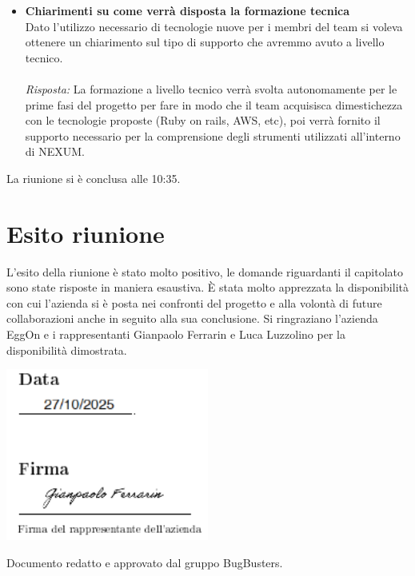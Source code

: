 \documentclass[a4paper,12pt]{article}
\begin{document}
\begin{itemize}
    \item \textbf{Chiarimenti su come verrà disposta la formazione tecnica}\\
    \noindent
    Dato l'utilizzo necessario di tecnologie nuove per i membri del team si voleva ottenere un chiarimento sul tipo di supporto che avremmo avuto a livello tecnico. \\ \\
    \textit{Risposta:} 
    La formazione a livello tecnico verrà svolta autonomamente per le prime fasi del progetto per fare in modo che il team acquisisca dimestichezza con le tecnologie proposte (Ruby on rails, AWS, etc), poi verrà fornito il supporto necessario per la comprensione degli strumenti utilizzati all'interno di NEXUM. 
    \vspace{1em}

\end{itemize}

La riunione si è conclusa alle 10:35.


\section{Esito riunione}
    L'esito della riunione è stato molto positivo, le domande riguardanti il capitolato sono state risposte in maniera esaustiva. È stata molto apprezzata la disponibilità con cui l'azienda si è posta nei confronti del progetto e alla volontà di future collaborazioni anche in seguito alla sua conclusione. Si ringraziano l'azienda EggOn e i rappresentanti Gianpaolo Ferrarin e Luca Luzzolino per la disponibilità dimostrata.
    
\vspace{1.0cm}
\noindent
\includegraphics[width=0.5\textwidth]{Data e firma.png}

\vfill
\begin{center}
    {\small\color{darkgray} Documento redatto e approvato dal gruppo BugBusters.}
\end{center}
\end{document}
